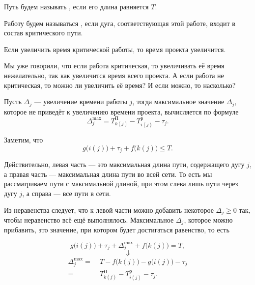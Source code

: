 
Путь будем называть , если его длина равняется $T$.


Работу будем называться , если дуга, соответствующая этой работе, входит в состав критического пути.

\remark

Если увеличить время критической работы, то время проекта увеличится.

\remark

Мы уже говорили, что если работа критическая, то увеличивать её время нежелательно, так как увеличится время всего проекта. А если работа не критическая, то можно ли увеличить её время? И если можно, то насколько?

\fact

Пусть $\Delta_j$ --- увеличение времени работы $j$, тогда максимальное значение $\Delta_j$, которое не приведёт к увеличению времени проекта, вычисляется по формуле
\[
\Delta_j^{\max} = T_{k(j)}^{\text{П}} - T_{i(j)}^{\text{р}} - \tau_j.
\]

\prooof

Заметим, что
\[
g\big(i(j)\big) + \tau_j + f\big(k(j)\big) \le T.
\]

Действительно, левая часть --- это максимальная длина пути, содержащего дугу $j$, а правая часть --- максимальная длина пути во всей сети. То есть мы рассматриваем пути с максимальной длиной, при этом слева лишь пути через дугу $j$, а справа --- все пути в сети. 

Из неравенства следует, что к левой части можно добавить некоторое $\Delta_j \ge 0$ так, чтобы неравенство всё ещё выполнялось. Максимальное $\Delta_j$, которое можно прибавить, это значение, при котором будет достигаться равенство, то есть

\[
g\big(i(j)\big) + \tau_j + \Delta_j^{\max} + f\big(k(j)\big) = T,
\]
\[
\Downarrow
\]
\begin{align*}
	\Delta_j^{\max} =& \; T - 	f\big(k(j)\big) - g\big(i(j)\big) - \tau_j \\
	=& \; T_{k(j)}^{\text{П}} - T_{i(j)}^{\text{р}} - \tau_j.
\end{align*}

